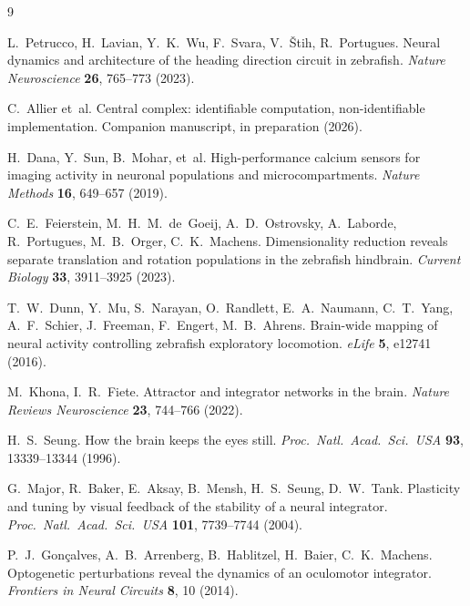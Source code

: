 \documentclass[11pt]{article}
\begin{document}

\begin{thebibliography}{9}

L.~Petrucco, H.~Lavian, Y.~K.~Wu, F.~Svara, V.~\v{S}tih, R.~Portugues.
Neural dynamics and architecture of the heading direction circuit in
zebrafish. \emph{Nature Neuroscience} \textbf{26}, 765--773 (2023).

C.~Allier et~al.
Central complex: identifiable computation, non-identifiable
implementation. Companion manuscript, in preparation (2026).

H.~Dana, Y.~Sun, B.~Mohar, et~al.
High-performance calcium sensors for imaging activity in neuronal
populations and microcompartments. \emph{Nature Methods} \textbf{16},
649--657 (2019).

C.~E.~Feierstein, M.~H.~M.~de~Goeij, A.~D.~Ostrovsky, A.~Laborde,
R.~Portugues, M.~B.~Orger, C.~K.~Machens.
Dimensionality reduction reveals separate translation and rotation
populations in the zebrafish hindbrain. \emph{Current Biology}
\textbf{33}, 3911--3925 (2023).

T.~W.~Dunn, Y.~Mu, S.~Narayan, O.~Randlett, E.~A.~Naumann, C.~T.~Yang,
A.~F.~Schier, J.~Freeman, F.~Engert, M.~B.~Ahrens.
Brain-wide mapping of neural activity controlling zebrafish exploratory
locomotion. \emph{eLife} \textbf{5}, e12741 (2016).

M.~Khona, I.~R.~Fiete.
Attractor and integrator networks in the brain.
\emph{Nature Reviews Neuroscience} \textbf{23}, 744--766 (2022).

H.~S.~Seung.
How the brain keeps the eyes still.
\emph{Proc.\ Natl.\ Acad.\ Sci.\ USA} \textbf{93}, 13339--13344 (1996).

G.~Major, R.~Baker, E.~Aksay, B.~Mensh, H.~S.~Seung, D.~W.~Tank.
Plasticity and tuning by visual feedback of the stability of a neural
integrator. \emph{Proc.\ Natl.\ Acad.\ Sci.\ USA} \textbf{101},
7739--7744 (2004).

P.~J.~Gon\c{c}alves, A.~B.~Arrenberg, B.~Hablitzel, H.~Baier,
C.~K.~Machens.
Optogenetic perturbations reveal the dynamics of an oculomotor
integrator. \emph{Frontiers in Neural Circuits} \textbf{8}, 10 (2014).


\end{thebibliography}
\end{document}
